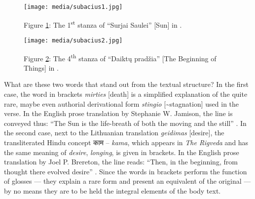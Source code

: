 \documentclass{article}
\begin{document}
\begin{figure}[H]
    \centering
    \texttt{[image: media/subacius1.jpg]}
    \caption{Figure \ref{fig:subacius1}: The 1\textsuperscript{st} stanza of ``Surjai Saulei'' [Sun] in \citealt[308]{maironis_pavasario_2020-1}.}
    \label{fig:subacius1}
\end{figure}

\begin{figure}[H]
    \centering
    \texttt{[image: media/subacius2.jpg]}
    \caption{Figure \ref{fig:subacius2}: The 4\textsuperscript{th} stanza of ``Daiktų pradžia'' [The Beginning of Things] in \citealt[300]{maironis_pavasario_2020-1}.}
    \label{fig:subacius2}
\end{figure}

What are these two words that stand out from the textual structure? In
the first case, the word in brackets \emph{mirties} {[}death{]} is a
simplified explanation of the quite rare, maybe even authorial
derivational form \emph{stingio} {[}\textasciitilde stagnation{]} used
in the verse. In the English prose translation by Stephanie W. Jamison,
the line is conveyed thus: ``The Sun is the life-breath of both the
moving and the still'' \parencite[267]{jamison_rigveda_2014}. In the second
case, next to the Lithuanian translation \emph{geidimas} {[}desire{]},
the transliterated Hindu concept \texthindi{काम}
-- \emph{kama}, which appears in
\emph{The Rigveda} and has the same meaning of \emph{desire},
\emph{longing}, is given in brackets. In the English prose translation
by Joel P. Brereton, the line reads: ``Then, in the beginning, from
thought there evolved desire'' \parencite[1607]{jamison_rigveda_2014}. Since
the words in brackets perform the function of glosses –– they explain a
rare form and present an equivalent of the original –– by no means
they are to be held the integral elements of the body text.
\end{document}
